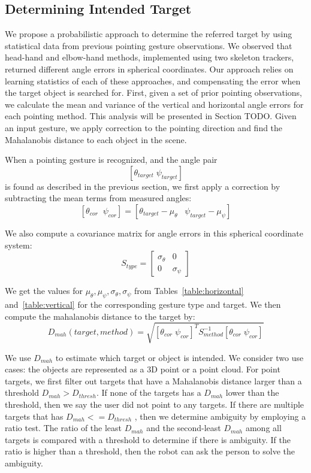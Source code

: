 \documentclass[12pt]{gatech-thesis}
\begin{document}
\subsection{Determining Intended Target}
\label{sec:pointing_determining_intended_target}

We propose a probabilistic approach to determine the referred target by using statistical data from previous pointing gesture observations. We observed that head-hand and elbow-hand methods, implemented using two skeleton trackers, returned different angle errors in spherical coordinates. Our approach relies on learning statistics of each of these approaches, and compensating the error when the target object is searched for. First, given a set of prior pointing observations, we calculate the mean and variance of the vertical and horizontal angle errors for each pointing method. This analysis will be presented in Section TODO. Given an input gesture, we apply correction to the pointing direction and find the Mahalanobis distance to each object in the scene.

When a pointing gesture is recognized, and the angle pair $$[\theta_{target}\;\psi_{target}]$$ is found as described in the previous section, we first apply a correction by subtracting the mean terms from measured angles:
$$[\theta_{cor}\;\;\psi_{cor}]=[\theta_{target}-\mu_{\theta}\;\;\;\psi_{target}-\mu_{\psi}]$$
 
We also compute a covariance matrix for angle errors in this spherical coordinate system: 
$$S_{type} = \begin{bmatrix}
\sigma_{\theta}&0\\ 0&\sigma_{\psi}
\end{bmatrix} $$

We get the values for $\mu_{\theta}, \mu_{\psi}, \sigma_{\theta} ,\sigma_{\psi}$ from Tables~\ref{table:horizontal} and~\ref{table:vertical} for the corresponding gesture type and target. We then compute the mahalanobis distance to the target by:
$$D_{mah}(target,method)=\sqrt{ [\theta_{cor}\;\psi_{cor}]^T S_{method}^{-1} [\theta_{cor}\;\psi_{cor}]}$$
 
We use $D_{mah}$ to estimate which target or object is intended. We consider two use cases: the objects are represented as a 3D point or a point cloud. For point targets, we first filter out targets that have a Mahalanobis distance larger than a threshold $D_{mah} > D_{thresh}$. If none of the targets has a $D_{mah}$ lower than the threshold, then we say the user did not point to any targets. If there are multiple targets that has $D_{mah} <= D_{thresh}$ , then we determine ambiguity by employing a ratio test. The ratio of the least $D_{mah}$ and the second-least $D_{mah}$ among all targets is compared with a threshold to determine if there is ambiguity. If the ratio is higher than a threshold, then the robot can ask the person to solve the ambiguity.
\end{document}
